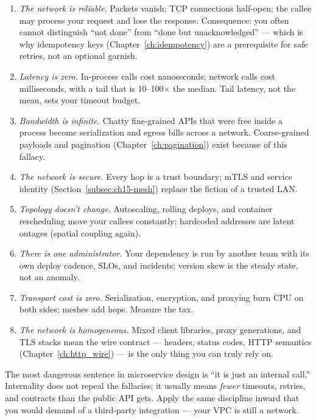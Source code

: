 \begin{enumerate}
  \item \emph{The network is reliable.} Packets vanish; TCP connections
        half-open; the callee may process your request and lose the
        response. Consequence: you often cannot distinguish ``not done''
        from ``done but unacknowledged'' --- which is why idempotency keys
        (Chapter~\ref{ch:idempotency}) are a prerequisite for safe retries,
        not an optional garnish.
  \item \emph{Latency is zero.} In-process calls cost nanoseconds; network
        calls cost milliseconds, with a tail that is 10--100$\times$ the
        median. Tail latency, not the mean, sets your timeout budget.
  \item \emph{Bandwidth is infinite.} Chatty fine-grained APIs that were
        free inside a process become serialization and egress bills across
        a network. Coarse-grained payloads and pagination
        (Chapter~\ref{ch:pagination}) exist because of this fallacy.
  \item \emph{The network is secure.} Every hop is a trust boundary; mTLS
        and service identity (Section~\ref{subsec:ch15-mesh}) replace the
        fiction of a trusted LAN.
  \item \emph{Topology doesn't change.} Autoscaling, rolling deploys, and
        container rescheduling move your callees constantly; hardcoded
        addresses are latent outages (spatial coupling again).
  \item \emph{There is one administrator.} Your dependency is run by
        another team with its own deploy cadence, SLOs, and incidents;
        version skew is the steady state, not an anomaly.
  \item \emph{Transport cost is zero.} Serialization, encryption, and
        proxying burn CPU on both sides; meshes add hops. Measure the tax.
  \item \emph{The network is homogeneous.} Mixed client libraries, proxy
        generations, and TLS stacks mean the wire contract --- headers,
        status codes, HTTP semantics (Chapter~\ref{ch:http_wire}) --- is
        the only thing you can truly rely on.
\end{enumerate}

\begin{warningbox}
The most dangerous sentence in microservice design is ``it is just an
internal call.'' Internality does not repeal the fallacies; it usually
means \emph{fewer} timeouts, retries, and contracts than the public API
gets. Apply the same discipline inward that you would demand of a
third-party integration --- your VPC is still a network.
\end{warningbox}

